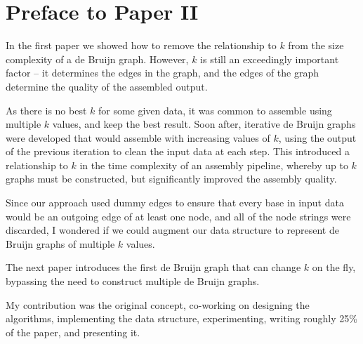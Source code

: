 \chapter*{Preface to Paper II}

In the first paper we showed how to remove the relationship to $k$ from the size complexity of a de Bruijn graph. However, $k$ is still an exceedingly important factor -- it determines the edges in the graph, and the edges of the graph determine the quality of the assembled output.

As there is no best $k$ for some given data, it was common to assemble using multiple $k$ values, and keep the best result. Soon after, iterative de Bruijn graphs were developed that would assemble with increasing values of $k$, using the output of the previous iteration to clean the input data at each step. This introduced a relationship to $k$ in the time complexity of an assembly pipeline, whereby up to $k$ graphs must be constructed, but significantly improved the assembly quality.

Since our approach used dummy edges to ensure that every base in input data would be an outgoing edge of at least one node, and all of the node strings were discarded, I wondered if we could augment our data structure to represent de Bruijn graphs of multiple $k$ values.

The next paper introduces the first de Bruijn graph that can change $k$ on the fly, bypassing the need to construct multiple de Bruijn graphs.

My contribution was the original concept, co-working on designing the algorithms, implementing the data structure, experimenting, writing roughly 25\% of the paper, and presenting it.

